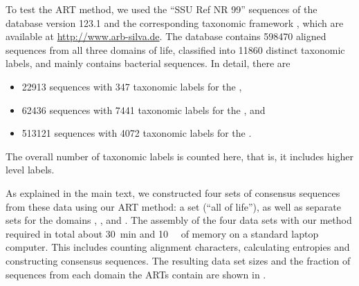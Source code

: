 To test the \acf{ART} method,
we used the ``SSU Ref NR 99'' sequences of the  database \citep{Quast2013} version 123.1
and the corresponding taxonomic framework \citep{Yilmaz2014}, which are available at \url{http://www.arb-silva.de}.
The database contains \num{598 470} aligned sequences from all three domains of life,
classified into \num{11 860} distinct taxonomic labels,
and mainly contains bacterial sequences.
In detail, there are
\begin{itemize}
    \item \num{ 22 913} sequences with \num{  347} taxonomic labels for the ,
    \item \num{ 62 436} sequences with \num{7 441} taxonomic labels for the , and
    \item \num{513 121} sequences with \num{4 072} taxonomic labels for the .
\end{itemize}
The overall number of taxonomic labels is counted here, that is, it includes higher level labels.



As explained in the main text, we constructed four sets of consensus sequences from these data using our \ac{ART} method:
a  set (``all of life''),
as well as separate sets for the domains , , and .
The assembly of the four data sets with our method required in total
about \SI{30}{\minute} and \SI{10}{\giga\byte} of memory on a standard laptop computer.
This includes counting alignment characters, calculating entropies and constructing consensus sequences.
The resulting data set sizes and the fraction of sequences from each domain the \acp{ART} contain
are shown in .

